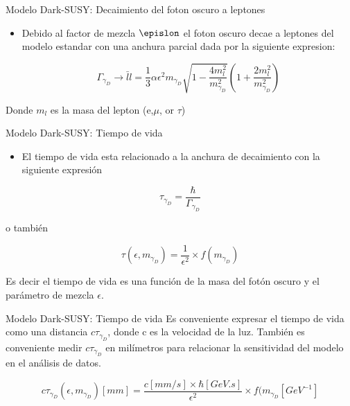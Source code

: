 \begin{frame}{Modelo Dark-SUSY: Decaimiento del foton oscuro a leptones}

\begin{itemize}
    \item Debido al factor de mezcla $\epislon$ el foton oscuro decae a leptones del modelo estandar con una anchura parcial dada por la siguiente expresion: 
    
    \begin{equation}
        \Gamma_{\gamma_{D}}\rightarrow \bar{l}l =\frac{1}{3}\alpha\epsilon^{2}m_{\gamma_{D}}\sqrt{1-\frac{4m_{l}^{2}}{m_{\gamma_{D}}^{2}}}\left(1+\frac{2m_{l}^{2}}{m_{\gamma_{D}}^{2}}\right)
    \end{equation}
\end{itemize}
    
Donde $m_{l}$ es la masa del lepton (e,$\mu$, or $\tau$)   
    
\end{frame}


\begin{frame}{Modelo Dark-SUSY: Tiempo de vida}

\begin{itemize}
    \item El tiempo de vida esta relacionado a la anchura de decaimiento con la siguiente expresión
\end{itemize}
    
    \begin{equation}
        \tau_{\gamma_{D}} = \frac{\hbar}{\Gamma_{\gamma_{D}}}
    \end{equation}
    
o también

\begin{equation}
    \tau(\epsilon, m_{\gamma_{D}}) = \frac{1}{\epsilon^{2}}\times f(m_{\gamma_{D}})
\end{equation}

Es decir el tiempo de vida es una función de la masa del fotón oscuro y el parámetro de mezcla $\epsilon$. 
    
\end{frame}


\begin{frame}{Modelo Dark-SUSY: Tiempo de vida}
    Es conveniente expresar el tiempo de vida como una distancia $c\tau_{\gamma_{D}}$, donde c es la velocidad de la luz. También es conveniente medir $c\tau_{\gamma_{D}}$ en milímetros para relacionar la sensitividad del modelo en el análisis de datos. 
    
    \begin{equation}
        c\tau_{\gamma_{D}}(\epsilon,m_{\gamma_{D}})[mm] = \frac{c[mm/s]\times \hbar[GeV.s]}{\epsilon^{2}} \times f(m_{\gamma_{D}}[GeV^{-1}]
    \end{equation}
    
    
\end{frame}

